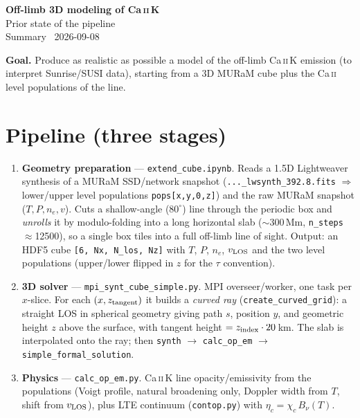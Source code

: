 \documentclass[10pt]{article}
\newcommand{\code}[1]{\texttt{\small #1}}
\begin{document}
\begin{center}
  {\LARGE\bfseries Off-limb 3D modeling of Ca\,\textsc{ii}\,K}\\[2pt]
  {\large\color{accent} Prior state of the pipeline}\\[2pt]
  {\small Summary \textperiodcentered\ 2026-09-08}
\end{center}

\vspace{-2pt}
\textbf{Goal.} Produce as realistic as possible a model of the off-limb Ca\,\textsc{ii}\,K
emission (to interpret Sunrise/SUSI data), starting from a 3D MURaM cube plus the
Ca\,\textsc{ii} level populations of the line.

\section{Pipeline (three stages)}
\begin{enumerate}[leftmargin=1.4em,itemsep=2pt,topsep=1pt]
  \item \textbf{Geometry preparation} --- \code{extend\_cube.ipynb}.
    Reads a 1.5D Lightweaver synthesis of a MURaM SSD/network snapshot
    (\code{...\_lwsynth\_392.8.fits} $\Rightarrow$ lower/upper level populations
    \code{pops[x,y,0,z]}) and the raw MURaM snapshot ($T,P,n_e,v$).
    Cuts a shallow-angle ($80^\circ$) line through the periodic box and
    \emph{unrolls} it by modulo-folding into a long horizontal slab
    ($\sim$300\,Mm, \code{n\_steps}$\approx$12500), so a single box tiles into a
    full off-limb line of sight. Output: an HDF5 cube
    \code{[6, Nx, N\_los, Nz]} with $T$, $P$, $n_e$, $v_{\rm LOS}$ and the two
    level populations (upper/lower flipped in $z$ for the $\tau$ convention).
  \item \textbf{3D solver} --- \code{mpi\_synt\_cube\_simple.py}.
    MPI overseer/worker, one task per $x$-slice. For each $(x,z_{\rm tangent})$ it
    builds a \emph{curved ray} (\code{create\_curved\_grid}): a straight LOS in
    spherical geometry giving path $s$, position $y$, and geometric height $z$
    above the surface, with tangent height $=z_{\rm index}\cdot 20$\,km. The slab
    is interpolated onto the ray; then \code{synth} $\to$ \code{calc\_op\_em}
    $\to$ \code{simple\_formal\_solution}.
  \item \textbf{Physics} --- \code{calc\_op\_em.py}.
    Ca\,\textsc{ii}\,K line opacity/emissivity from the populations (Voigt profile,
    natural broadening only, Doppler width from $T$, shift from $v_{\rm LOS}$),
    plus LTE continuum (\code{contop.py}) with $\eta_c=\chi_c\,B_\nu(T)$.
\end{enumerate}
\end{document}
